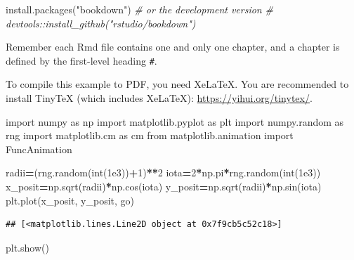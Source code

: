 \documentclass[
]{book}
\newenvironment{Shaded}{\begin{snugshade}}{\end{snugshade}}
\newcommand{\BuiltInTok}[1]{#1}
\newcommand{\CommentTok}[1]{\textcolor[rgb]{0.56,0.35,0.01}{\textit{#1}}}
\newcommand{\DecValTok}[1]{\textcolor[rgb]{0.00,0.00,0.81}{#1}}
\newcommand{\FloatTok}[1]{\textcolor[rgb]{0.00,0.00,0.81}{#1}}
\newcommand{\FunctionTok}[1]{\textcolor[rgb]{0.00,0.00,0.00}{#1}}
\newcommand{\ImportTok}[1]{#1}
\newcommand{\NormalTok}[1]{#1}
\newcommand{\OperatorTok}[1]{\textcolor[rgb]{0.81,0.36,0.00}{\textbf{#1}}}
\newcommand{\StringTok}[1]{\textcolor[rgb]{0.31,0.60,0.02}{#1}}
\begin{document}
\begin{Shaded}
\begin{Highlighting}[]
\FunctionTok{install.packages}\NormalTok{(}\StringTok{"bookdown"}\NormalTok{)}
\CommentTok{\# or the development version}
\CommentTok{\# devtools::install\_github("rstudio/bookdown")}
\end{Highlighting}
\end{Shaded}

Remember each Rmd file contains one and only one chapter, and a chapter is defined by the first-level heading \texttt{\#}.

To compile this example to PDF, you need XeLaTeX. You are recommended to install TinyTeX (which includes XeLaTeX): \url{https://yihui.org/tinytex/}.

\begin{Shaded}
\begin{Highlighting}[]
\ImportTok{import}\NormalTok{ numpy }\ImportTok{as}\NormalTok{ np}
\ImportTok{import}\NormalTok{ matplotlib.pyplot }\ImportTok{as}\NormalTok{ plt}
\ImportTok{import}\NormalTok{ numpy.random }\ImportTok{as}\NormalTok{ rng}
\ImportTok{import}\NormalTok{ matplotlib.cm }\ImportTok{as}\NormalTok{ cm}
\ImportTok{from}\NormalTok{ matplotlib.animation }\ImportTok{import}\NormalTok{ FuncAnimation}

\NormalTok{radii}\OperatorTok{=}\NormalTok{(rng.random(}\BuiltInTok{int}\NormalTok{(}\FloatTok{1e3}\NormalTok{))}\OperatorTok{+}\DecValTok{1}\NormalTok{)}\OperatorTok{**}\DecValTok{2}
\NormalTok{iota}\OperatorTok{=}\DecValTok{2}\OperatorTok{*}\NormalTok{np.pi}\OperatorTok{*}\NormalTok{rng.random(}\BuiltInTok{int}\NormalTok{(}\FloatTok{1e3}\NormalTok{))}
\NormalTok{x\_posit}\OperatorTok{=}\NormalTok{np.sqrt(radii)}\OperatorTok{*}\NormalTok{np.cos(iota)}
\NormalTok{y\_posit}\OperatorTok{=}\NormalTok{np.sqrt(radii)}\OperatorTok{*}\NormalTok{np.sin(iota)}
\NormalTok{plt.plot(x\_posit, y\_posit, }\StringTok{\textquotesingle{}go\textquotesingle{}}\NormalTok{)}
\end{Highlighting}
\end{Shaded}

\begin{verbatim}
## [<matplotlib.lines.Line2D object at 0x7f9cb5c52c18>]
\end{verbatim}

\begin{Shaded}
\begin{Highlighting}[]
\NormalTok{plt.show()}
\end{Highlighting}
\end{Shaded}
\end{document}
